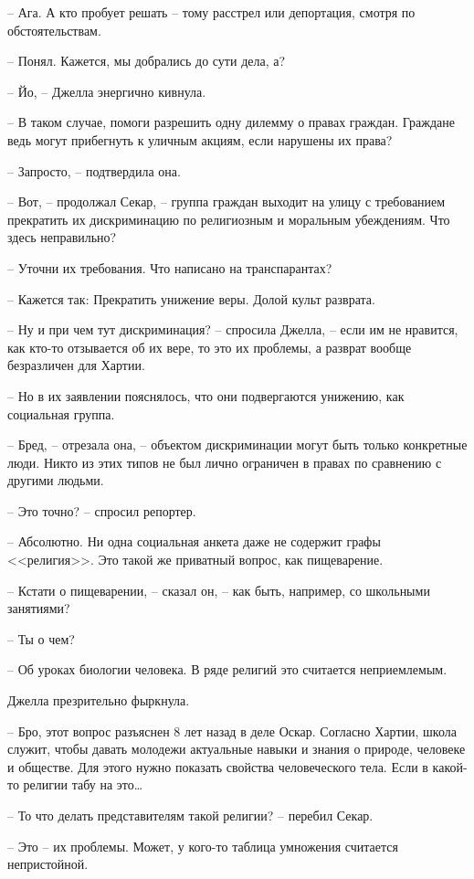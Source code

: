 -- Ага. А кто пробует решать -- тому расстрел или депортация, смотря по обстоятельствам.

-- Понял. Кажется, мы добрались до сути дела, а?

-- Йо, -- Джелла энергично кивнула.

-- В таком случае, помоги разрешить одну дилемму о правах граждан. Граждане ведь могут прибегнуть к уличным акциям, если нарушены их права?

-- Запросто, -- подтвердила она.

-- Вот, -- продолжал Секар, -- группа граждан выходит на улицу с требованием прекратить их дискриминацию по религиозным и моральным убеждениям. Что здесь неправильно?

-- Уточни их требования. Что написано на транспарантах?

-- Кажется так: Прекратить унижение веры. Долой культ разврата.

-- Ну и при чем тут дискриминация? -- спросила Джелла, -- если им не нравится, как кто-то отзывается об их вере, то это их проблемы, а разврат вообще безразличен для Хартии.

-- Но в их заявлении пояснялось, что они подвергаются унижению, как социальная группа.

-- Бред, -- отрезала она, -- объектом дискриминации могут быть только конкретные люди. Никто из этих типов не был лично ограничен в правах по сравнению с другими людьми.

-- Это точно? -- спросил репортер.

-- Абсолютно. Ни одна социальная анкета даже не содержит графы <<религия>>. Это такой же приватный вопрос, как пищеварение.

-- Кстати о пищеварении, -- сказал он, -- как быть, например, со школьными занятиями?

-- Ты о чем?

-- Об уроках биологии человека. В ряде религий это считается неприемлемым.

Джелла презрительно фыркнула.

-- Бро, этот вопрос разъяснен 8 лет назад в деле Оскар. Согласно Хартии, школа служит, чтобы давать молодежи актуальные навыки и знания о природе, человеке и обществе. Для этого нужно показать свойства человеческого тела. Если в какой-то религии табу на это\ldots{}

-- То что делать представителям такой религии? -- перебил Секар.

-- Это -- их проблемы. Может, у кого-то таблица умножения считается непристойной.

